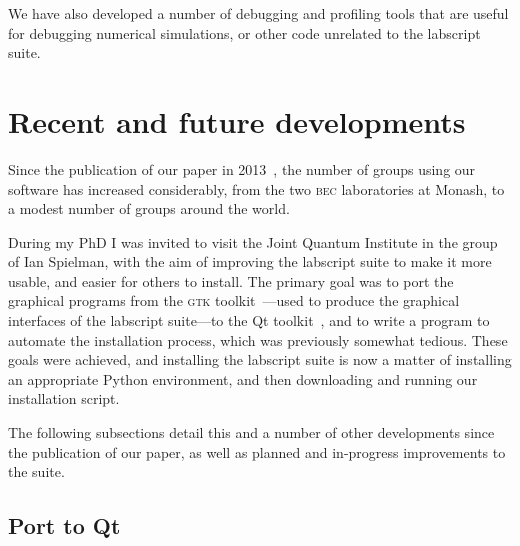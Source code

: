 We have also developed a number of debugging and profiling tools that are useful for debugging numerical simulations, or other code unrelated to the labscript suite.


\section{Recent and future developments}

Since the publication of our paper in 2013~\cite{starkey_scripted_2013}, the number of groups using our software has increased considerably, from the two \textsc{bec} laboratories at Monash, to a modest number of groups around the world.

During my PhD I was invited to visit the Joint Quantum Institute in the group of Ian Spielman, with the aim of improving the labscript suite to make it more usable, and easier for others to install. The primary goal was to port the graphical programs from the \textsc{gtk} toolkit~\cite{the_gnome_project_gtk+_2018}---used to produce the graphical interfaces of the labscript suite---to the Qt toolkit~\cite{the_qt_company_qt_2018}, and to write a program to automate the installation process, which was previously somewhat tedious. These goals were achieved, and installing the labscript suite is now a matter of installing an appropriate Python environment, and then downloading and running our installation script.

The following subsections detail this and a number of other developments since the publication of our paper, as well as planned and in-progress improvements to the suite.

\subsection{Port to Qt}

